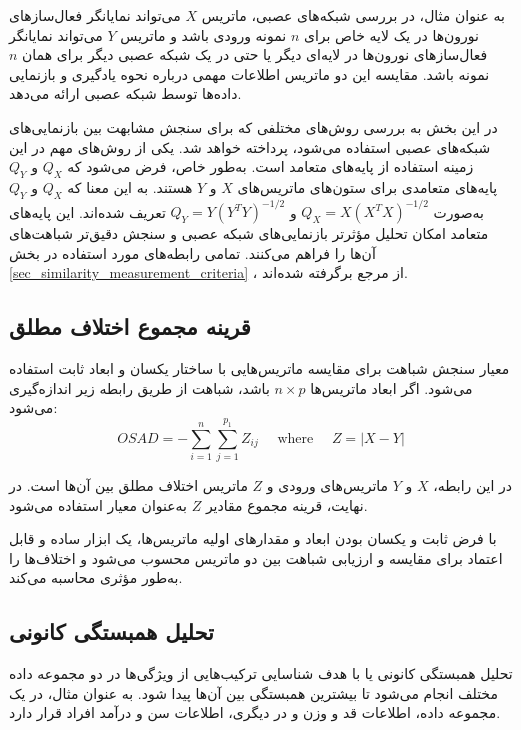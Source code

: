  به عنوان مثال، در بررسی شبکه‌های عصبی، ماتریس \( X \) می‌تواند نمایانگر فعال‌سازهای%
 نورون‌ها در یک لایه خاص برای \( n \) نمونه ورودی باشد و ماتریس \( Y \) می‌تواند نمایانگر فعال‌سازهای نورون‌ها در لایه‌ای دیگر یا حتی در یک شبکه عصبی دیگر برای همان \( n \) نمونه باشد. مقایسه این دو ماتریس اطلاعات مهمی درباره نحوه یادگیری و بازنمایی داده‌ها توسط شبکه عصبی ارائه می‌دهد.
 
 
 در این بخش به بررسی روش‌های مختلفی که برای سنجش مشابهت بین بازنمایی‌های شبکه‌های عصبی استفاده می‌شود، پرداخته خواهد شد. یکی از روش‌های مهم در این زمینه استفاده از پایه‌های متعامد است. به‌طور خاص، فرض می‌شود که \( Q_X \) و \( Q_Y \) پایه‌های متعامدی برای ستون‌های ماتریس‌های \( X \) و \( Y \) هستند. به این معنا که \( Q_X \) و \( Q_Y \) به‌صورت \( Q_X = X(X^T X)^{-1/2} \) و \( Q_Y = Y(Y^T Y)^{-1/2} \) تعریف شده‌اند. این پایه‌های متعامد امکان تحلیل مؤثرتر بازنمایی‌های شبکه عصبی و سنجش دقیق‌تر شباهت‌های آن‌ها را فراهم می‌کنند.
 تمامی رابطه‌های مورد استفاده در بخش
 \ref{sec_similarity_measurement_criteria}%
 ، از مرجع 
 \cite{kornblith2019similarity} 
 برگرفته شده‌اند.
 
 
 
 
 \subsection{
 	قرینه مجموع اختلاف مطلق%
 }
 معیار سنجش شباهت  
 برای مقایسه ماتریس‌هایی با ساختار یکسان و ابعاد ثابت استفاده می‌شود. اگر ابعاد ماتریس‌ها \( n \times p \) باشد، شباهت از طریق رابطه زیر اندازه‌گیری می‌شود:  
 \[
 OSAD = -\sum_{i=1}^n \sum_{j=1}^{p_1} Z_{ij}  
 \quad \text { where } \quad  
 Z = |X-Y|  
 \]  
 
 در این رابطه، \( X \) و \( Y \) ماتریس‌های ورودی و \( Z \) ماتریس اختلاف مطلق بین آن‌ها است. در نهایت، قرینه مجموع مقادیر \( Z \) به‌عنوان معیار  
 استفاده می‌شود.  
 
 با فرض ثابت و یکسان بودن ابعاد و مقدارهای اولیه ماتریس‌ها،  
 یک ابزار ساده و قابل اعتماد برای مقایسه و ارزیابی شباهت بین دو ماتریس محسوب می‌شود و اختلاف‌ها را به‌طور مؤثری محاسبه می‌کند.
 
  
 
 \subsection{
 	تحلیل همبستگی کانونی%
 }
 تحلیل همبستگی کانونی یا  
 با هدف شناسایی ترکیب‌هایی از ویژگی‌ها در دو مجموعه داده مختلف انجام می‌شود تا بیشترین همبستگی بین آن‌ها پیدا شود. به عنوان مثال، در یک مجموعه داده، اطلاعات قد و وزن و در دیگری، اطلاعات سن و درآمد افراد قرار دارد.  
 
